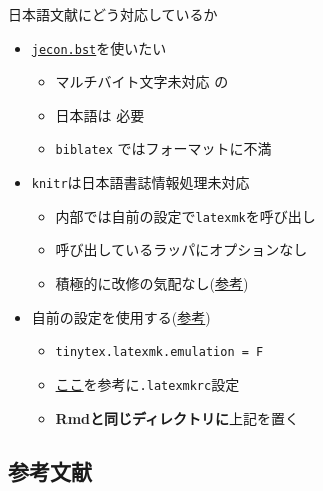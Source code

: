 \documentclass[
  12pt,
  ignorenonframetext,
]{beamer}
\newif\ifbibliography
\providecommand{\tightlist}{%
  \setlength{\itemsep}{0pt}\setlength{\parskip}{0pt}}
\begin{document}
\begin{frame}[fragile]{日本語文献にどう対応しているか}
\protect\hypertarget{ux65e5ux672cux8a9eux6587ux732eux306bux3069ux3046ux5bfeux5fdcux3057ux3066ux3044ux308bux304b}{}

\begin{itemize}
\tightlist
\item
  \href{https://github.com/ShiroTakeda/jecon-bst/blob/master/jecon.bst}{\texttt{jecon.bst}}を使いたい

  \begin{itemize}
  \tightlist
  \item
    マルチバイト文字未対応 の\BibTeX 
  \item
    日本語は \upBibTeX 必要
  \item
    \texttt{biblatex} ではフォーマットに不満
  \end{itemize}
\item
  \texttt{knitr}は日本語書誌情報処理未対応

  \begin{itemize}
  \tightlist
  \item
    内部では自前の設定で\texttt{latexmk}を呼び出し
  \item
    呼び出しているラッパにオプションなし
  \item
    積極的に改修の気配なし(\href{https://github.com/yihui/tinytex/issues/70}{参考})
  \end{itemize}
\item
  自前の設定を使用する(\href{https://github.com/kenjimyzk/bookdown_ja_template}{参考})

  \begin{itemize}
  \tightlist
  \item
    \texttt{tinytex.latexmk.emulation\ =\ F}
  \item
    \href{https://texwiki.texjp.org/?Latexmk}{ここ}を参考に\texttt{.latexmkrc}設定
  \item
    \textbf{Rmdと同じディレクトリに}上記を置く
  \end{itemize}
\end{itemize}

\end{frame}

\begin{frame}

\section*{参考文献}

\end{frame}

\begin{frame}[allowframebreaks]{}
  \bibliographytrue
  
\end{frame}
\end{document}
